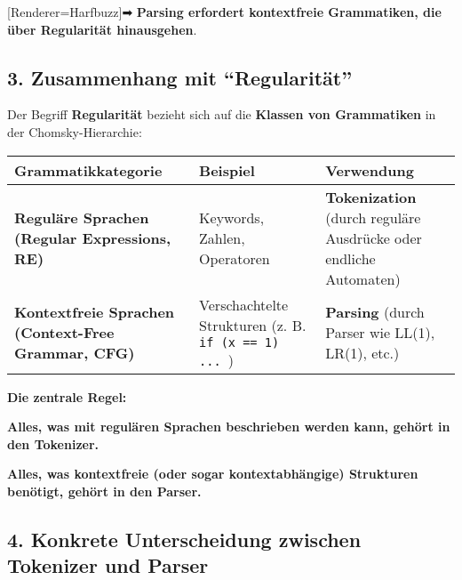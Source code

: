 \documentclass[a4paper]{article}
\newcommand{\uliji}[1]{
  {\setmainfont{Noto Color Emoji}[Renderer=Harfbuzz]{#1}}
}
\begin{document}
\uliji{➡} \textbf{Parsing erfordert kontextfreie Grammatiken, die über Regularität hinausgehen}.
\subsection*{3. Zusammenhang mit "`Regularität"'}
Der Begriff \textbf{Regularität} bezieht sich auf die \textbf{Klassen von Grammatiken} in der Chomsky-Hierarchie:

\begin{table}[h]
\centering
\small
\begin{tabu} to \linewidth { |X[m,c]|X[m,c]|X[m,c]| }

\hline
\textbf{Grammatikkategorie} & \textbf{Beispiel} & \textbf{Verwendung}\\\hline 
\hline
\textbf{Reguläre Sprachen (Regular Expressions, RE)} & Keywords, Zahlen, Operatoren & \textbf{Tokenization} (durch reguläre Ausdrücke oder endliche Automaten)\\\hline 
\textbf{Kontextfreie Sprachen (Context-Free Grammar, CFG)} & Verschachtelte Strukturen (z. B. \texttt{if (x == 1) { ... }}) & \textbf{Parsing} (durch Parser wie LL(1), LR(1), etc.)\\\hline 
\end{tabu}
\end{table}

\textbf{Die zentrale Regel:}
\begin{itemize}
  \begin{item}
    \textbf{Alles, was mit regulären Sprachen beschrieben werden kann, gehört in den Tokenizer.}
  \end{item}
  \begin{item}
    \textbf{Alles, was kontextfreie (oder sogar kontextabhängige) Strukturen benötigt, gehört in den Parser.}
  \end{item}
\end{itemize}
\subsection*{4. Konkrete Unterscheidung zwischen Tokenizer und Parser}
\end{document}
